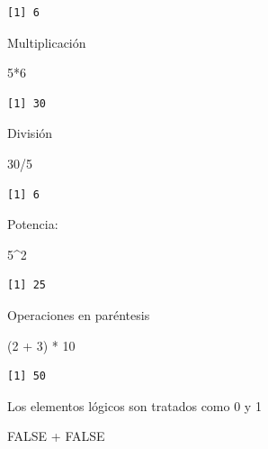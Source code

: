 \documentclass[
  letterpaper,
  DIV=11,
  numbers=noendperiod,
  twoside]{scrreprt}
\newenvironment{Shaded}{\begin{snugshade}}{\end{snugshade}}
\newcommand{\ConstantTok}[1]{\textcolor[rgb]{0.56,0.35,0.01}{#1}}
\newcommand{\DecValTok}[1]{\textcolor[rgb]{0.68,0.00,0.00}{#1}}
\newcommand{\NormalTok}[1]{\textcolor[rgb]{0.00,0.23,0.31}{#1}}
\newcommand{\SpecialCharTok}[1]{\textcolor[rgb]{0.37,0.37,0.37}{#1}}
\begin{document}
\begin{verbatim}
[1] 6
\end{verbatim}

Multiplicación

\begin{Shaded}
\begin{Highlighting}[]
\DecValTok{5}\SpecialCharTok{*}\DecValTok{6}
\end{Highlighting}
\end{Shaded}

\begin{verbatim}
[1] 30
\end{verbatim}

División

\begin{Shaded}
\begin{Highlighting}[]
\DecValTok{30}\SpecialCharTok{/}\DecValTok{5}
\end{Highlighting}
\end{Shaded}

\begin{verbatim}
[1] 6
\end{verbatim}

Potencia:

\begin{Shaded}
\begin{Highlighting}[]
\DecValTok{5}\SpecialCharTok{\^{}}\DecValTok{2}
\end{Highlighting}
\end{Shaded}

\begin{verbatim}
[1] 25
\end{verbatim}

Operaciones en paréntesis

\begin{Shaded}
\begin{Highlighting}[]
\NormalTok{(}\DecValTok{2} \SpecialCharTok{+} \DecValTok{3}\NormalTok{) }\SpecialCharTok{*} \DecValTok{10} 
\end{Highlighting}
\end{Shaded}

\begin{verbatim}
[1] 50
\end{verbatim}

Los elementos lógicos son tratados como 0 y 1

\begin{Shaded}
\begin{Highlighting}[]
\ConstantTok{FALSE} \SpecialCharTok{+} \ConstantTok{FALSE}
\end{Highlighting}
\end{Shaded}
\end{document}
